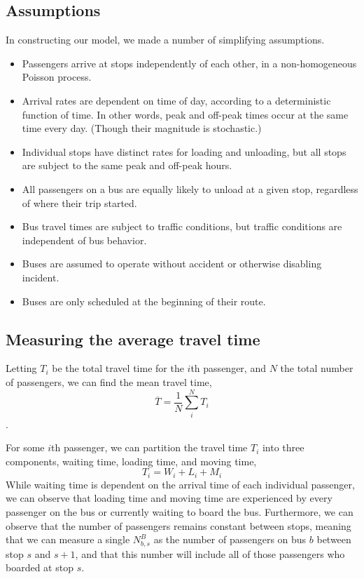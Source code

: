 \documentclass[12pt]{article}
\begin{document}
\subsection{Assumptions}
In constructing our model, we made a number of simplifying assumptions.
\begin{itemize}
    \item Passengers arrive at stops independently of each other, in
        a non-homogeneous Poisson process.
    \item Arrival rates are dependent on time of day, according to a
        deterministic function of time. In other words, peak and off-peak
        times occur at the same time every day. (Though their magnitude is
        stochastic.)
    \item Individual stops have distinct rates for loading and unloading, but
        all stops are subject to the same peak and off-peak hours.
    \item All passengers on a bus are equally likely to unload at a given
        stop, regardless of where their trip started.
    \item Bus travel times are subject to traffic conditions, but traffic
        conditions are independent of bus behavior.
    \item Buses are assumed to operate without accident or otherwise disabling
        incident.
    \item Buses are only scheduled at the beginning of their route.
\end{itemize}

\subsection{Measuring the average travel time}

Letting $T_i$ be the total travel time for the $i$th passenger, and $N$ the
total number of passengers, we can find the mean travel time,
\[
    \overline{T} = \frac{1}{N}\sum_i^N T_i
\].

For some $i$th passenger, we can partition the travel time $T_i$ into three
components, waiting time, loading time, and moving time,
\[
    T_i = W_i + L_i + M_i
\]
While waiting time is dependent on the arrival time of each individual
passenger, we can observe that loading time and moving time are experienced by
every passenger on the bus or currently waiting to board the bus. Furthermore,
we can observe that the number of passengers remains constant between stops,
meaning that we can measure a single $N^B_{b,s}$ as the number of passengers
on bus $b$ between stop $s$ and $s+1$, and that this number will include all
of those passengers who boarded at stop $s$.
\end{document}
